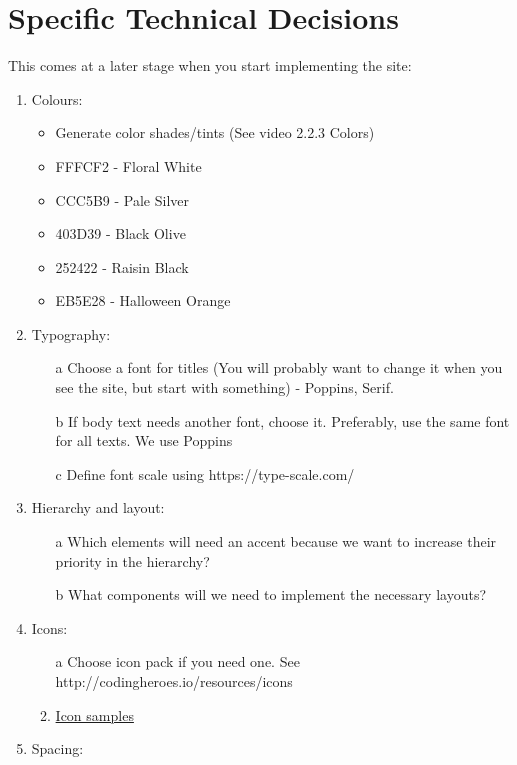 \documentclass{article}
\begin{document}
\section{Specific Technical Decisions }
This comes at a later stage when you start implementing the site:
\begin{enumerate}
    \item Colours:
    \begin{itemize}
        \item Generate color shades/tints (See video 2.2.3 Colors)
        \item FFFCF2 - Floral White 
        \item CCC5B9 - Pale Silver
        \item 403D39 - Black Olive
        \item 252422 - Raisin Black
        \item EB5E28 - Halloween Orange
    \end{itemize}
    \item Typography:
    \begin{enumerate}
        \item[a] Choose a font for titles (You will probably want to change it when you see the site, but
start with something) - Poppins, Serif.
        \item[b] If body text needs another font, choose it. Preferably, use the same font for all texts.
        We use Poppins
        \item[c] Define font scale using https://type-scale.com/
    \end{enumerate}
    \item Hierarchy and layout:
    \begin{enumerate}
        \item[a] Which elements will need an accent because we want to increase their priority in the
hierarchy?
        \item[b] What components will we need to implement the necessary layouts?
    \end{enumerate}
    \item Icons:
    \begin{enumerate}
        \item[a] Choose icon pack if you need one. See http://codingheroes.io/resources/icons
        \item \href{https://phosphoricons.com/}{Icon samples}
    \end{enumerate}
    \item  Spacing:
        \begin{enumerate}

\end{enumerate}
\end{enumerate}
\end{document}
